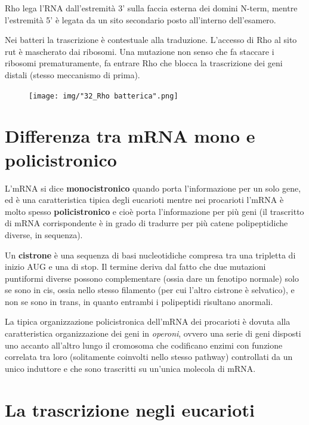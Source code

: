 \documentclass[11pt]{book}
\begin{document}
Rho lega l'RNA dall'estremità 3' sulla faccia esterna dei domini N-term,
mentre l'estremità 5' è legata da un sito secondario posto all'interno
dell'esamero.

Nei batteri la trascrizione è contestuale alla traduzione. L'accesso di
Rho al sito rut è mascherato dai ribosomi. Una mutazione non senso che
fa staccare i ribosomi prematuramente, fa entrare Rho che blocca la
trascrizione dei geni distali (stesso meccanismo di prima).

\begin{figure}[htp]
\centering
\texttt{[image: img/"32\_Rho batterica".png]}
\caption{}
\label{rho-batterica}
\end{figure}

\section{Differenza tra mRNA mono e
policistronico}\label{differenza-tra-mrna-mono-e-policistronico}

L'mRNA si dice \textbf{monocistronico} quando porta l'informazione per
un solo gene, ed è una caratteristica tipica degli eucarioti mentre nei
procarioti l'mRNA è molto spesso \textbf{policistronico} e cioè porta
l'informazione per più geni (il trascritto di mRNA corrispondente è in
grado di tradurre per più catene polipeptidiche diverse, in sequenza).

Un \textbf{cistrone} è una sequenza di basi nucleotidiche compresa tra
una tripletta di inizio AUG e una di stop. Il termine deriva dal fatto
che due mutazioni puntiformi diverse possono complementare (ossia dare
un fenotipo normale) solo se sono in cis, ossia nello stesso filamento
(per cui l'altro cistrone è selvatico), e non se sono in trans, in
quanto entrambi i polipeptidi risultano anormali.

La tipica organizzazione policistronica dell'mRNA dei procarioti è
dovuta alla caratteristica organizzazione dei geni in \emph{operoni},
ovvero una serie di geni disposti uno accanto all'altro lungo il
cromosoma che codificano enzimi con funzione correlata tra loro
(solitamente coinvolti nello stesso pathway) controllati da un unico
induttore e che sono trascritti su un'unica molecola di mRNA.

\section{La trascrizione negli
eucarioti}\label{la-trascrizione-negli-eucarioti}
\end{document}
